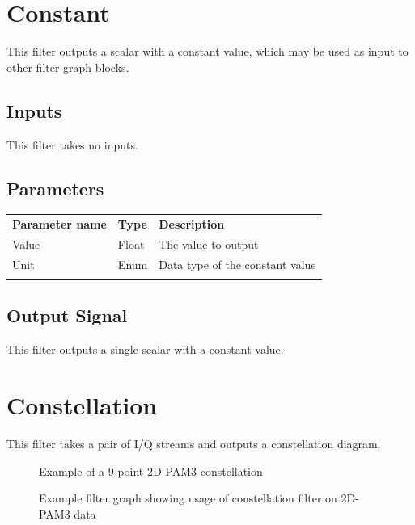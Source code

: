 \section{Constant}
\label{filter:constant}

This filter outputs a scalar with a constant value, which may be used as input to other filter graph blocks.

\subsection{Inputs}

This filter takes no inputs.

\subsection{Parameters}

\begin{tabularx}{16cm}{llX}
\thickhline
\textbf{Parameter name} & \textbf{Type} & \textbf{Description} \\
\thickhline
Value & Float & The value to output\\
\thinhline
Unit & Enum & Data type of the constant value\\
\thickhline
\end{tabularx}

\subsection{Output Signal}

This filter outputs a single scalar with a constant value.

\pagebreak
\section{Constellation}
\label{filter:constellation}

This filter takes a pair of I/Q streams and outputs a constellation diagram.

\begin{figure}[h]
\centering
{}
\caption{Example of a 9-point 2D-PAM3 constellation}
\label{filter_constellation}
\end{figure}

\begin{figure}[h]
\centering
{}
\caption{Example filter graph showing usage of constellation filter on 2D-PAM3 data}
\label{filter_graph_constellation}
\end{figure}

